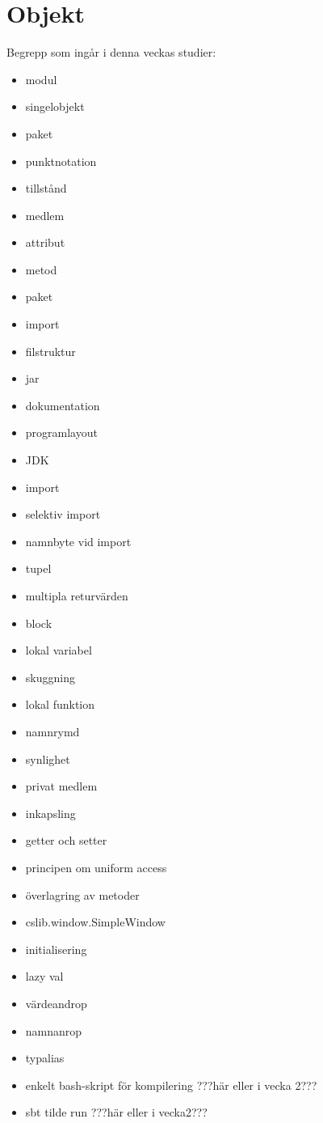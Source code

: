 \chapter{Objekt}\label{chapter:W04}
Begrepp som ingår i denna veckas studier:
\begin{multicols}{2}\begin{itemize}[noitemsep,label={$\square$},leftmargin=*]
\item modul
\item singelobjekt
\item paket
\item punktnotation
\item tillstånd
\item medlem
\item attribut
\item metod
\item paket
\item import
\item filstruktur
\item jar
\item dokumentation
\item programlayout
\item JDK
\item import
\item selektiv import
\item namnbyte vid import
\item tupel
\item multipla returvärden
\item block
\item lokal variabel
\item skuggning
\item lokal funktion
\item namnrymd
\item synlighet
\item privat medlem
\item inkapsling
\item getter och setter
\item principen om uniform access
\item överlagring av metoder
\item cslib.window.SimpleWindow
\item initialisering
\item lazy val
\item värdeandrop
\item namnanrop
\item typalias
\item enkelt bash-skript för kompilering ???här eller i vecka 2???
\item sbt tilde run ???här eller i vecka2???\end{itemize}\end{multicols}
